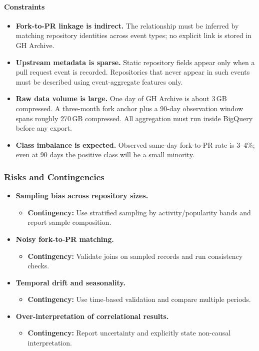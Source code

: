 \paragraph{Constraints}
\begin{itemize}
  \item \textbf{Fork-to-PR linkage is indirect.} The relationship must be inferred by matching repository identities across event types; no explicit link is stored in GH Archive.
  \item \textbf{Upstream metadata is sparse.} Static repository fields appear only when a pull request event is recorded. Repositories that never appear in such events must be described using event-aggregate features only.
  \item \textbf{Raw data volume is large.} One day of GH Archive is about 3\,GB compressed. A three-month fork anchor plus a 90-day observation window spans roughly 270\,GB compressed. All aggregation must run inside BigQuery before any export.
  \item \textbf{Class imbalance is expected.} Observed same-day fork-to-PR rate is 3--4\%; even at 90 days the positive class will be a small minority.
\end{itemize}

\subsubsection{Risks and Contingencies}
\begin{itemize}
  \item \textbf{Sampling bias across repository sizes.}
  \begin{itemize}
    \item \textbf{Contingency:} Use stratified sampling by activity/popularity bands and report sample composition.
  \end{itemize}
  \item \textbf{Noisy fork-to-PR matching.}
  \begin{itemize}
    \item \textbf{Contingency:} Validate joins on sampled records and run consistency checks.
  \end{itemize}
  \item \textbf{Temporal drift and seasonality.}
  \begin{itemize}
    \item \textbf{Contingency:} Use time-based validation and compare multiple periods.
  \end{itemize}
  \item \textbf{Over-interpretation of correlational results.}
  \begin{itemize}
    \item \textbf{Contingency:} Report uncertainty and explicitly state non-causal interpretation.
  \end{itemize}
\end{itemize}

